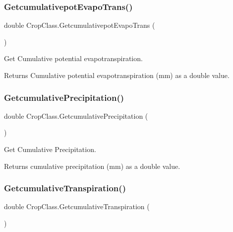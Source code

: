 \subsubsection{\texorpdfstring{GetcumulativepotEvapoTrans()}{GetcumulativepotEvapoTrans()}}
{\footnotesize\ttfamily double Crop\+Class.\+Getcumulativepot\+Evapo\+Trans (\begin{DoxyParamCaption}{ }\end{DoxyParamCaption})\hspace{0.3cm}{\ttfamily [inline]}}



Get Cumulative potential evapotranspiration. 

\begin{DoxyReturn}{Returns}
Cumulative potential evapotranspiration (mm) as a double value. 
\end{DoxyReturn}
\mbox{\label{class_crop_class_a0676d46f97d4a0a5e8f48721611b2184}} 
\subsubsection{\texorpdfstring{GetcumulativePrecipitation()}{GetcumulativePrecipitation()}}
{\footnotesize\ttfamily double Crop\+Class.\+Getcumulative\+Precipitation (\begin{DoxyParamCaption}{ }\end{DoxyParamCaption})\hspace{0.3cm}{\ttfamily [inline]}}



Get Cumulative Precipitation. 

\begin{DoxyReturn}{Returns}
cumulative precipitation (mm) as a double value. 
\end{DoxyReturn}
\mbox{\label{class_crop_class_a4fc23e5a31457a2f088ab6ffcb394fa2}} 
\subsubsection{\texorpdfstring{GetcumulativeTranspiration()}{GetcumulativeTranspiration()}}
{\footnotesize\ttfamily double Crop\+Class.\+Getcumulative\+Transpiration (\begin{DoxyParamCaption}{ }\end{DoxyParamCaption})\hspace{0.3cm}{\ttfamily [inline]}}



